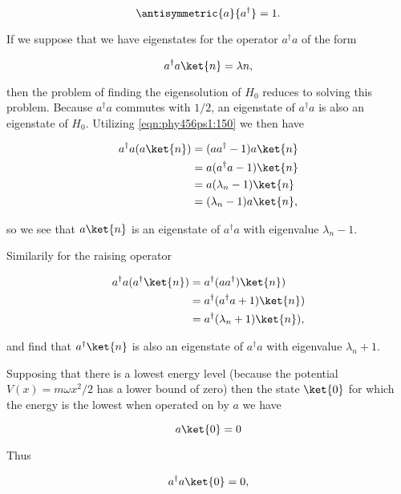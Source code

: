 \begin{equation}\label{eqn:phy456ps1:150}
\antisymmetric{a}{a^\dagger} = 1.
\end{equation}

If we suppose that we have eigenstates for the operator $a^\dagger a$ of the form

\begin{equation}\label{eqn:phy456ps1:200}
a^\dagger a \ket{n} = \lambda{n},
\end{equation}

then the problem of finding the eigensolution of $H_0$ reduces to solving this problem.  Because $a^\dagger a$ commutes with $1/2$, an eigenstate of $a^\dagger a$ is also an eigenstate of $H_0$.  Utilizing \ref{eqn:phy456ps1:150} we then have

\begin{align*}
a^\dagger a ( a \ket{n} )
&= (a a^\dagger - 1 ) a \ket{n} \\
&= a (a^\dagger a - 1 ) \ket{n} \\
&= a (\lambda_n - 1 ) \ket{n} \\
&= (\lambda_n - 1 ) a \ket{n},
\end{align*}

so we see that $a \ket{n}$ is an eigenstate of $a^\dagger a$ with eigenvalue $\lambda_n - 1$.

Similarily for the raising operator

\begin{align*}
a^\dagger a ( a^\dagger \ket{n} )
&=
a^\dagger (a  a^\dagger) \ket{n} ) \\
&=
a^\dagger (a^\dagger a + 1) \ket{n} ) \\
&=
a^\dagger (\lambda_n + 1) \ket{n} ),
\end{align*}

and find that $a^\dagger \ket{n}$ is also an eigenstate of $a^\dagger a$ with eigenvalue $\lambda_n + 1$.

Supposing that there is a lowest energy level (because the potential $V(x) = m \omega x^2 /2$ has a lower bound of zero) then the state $\ket{0}$ for which the energy is the lowest when operated on by $a$ we have

\begin{equation}\label{eqn:phy456ps1:220}
a \ket{0} = 0 
\end{equation}

Thus 

\begin{equation}\label{eqn:phy456ps1:240}
a^\dagger a \ket{0} = 0,
\end{equation}

